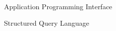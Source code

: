\begin{siglas}
    \item[API] Application Programming Interface
    \item[SQL] Structured Query Language
\end{siglas}
